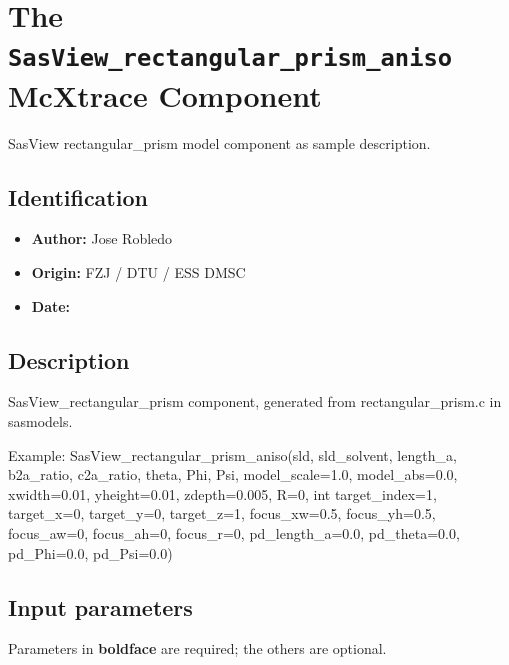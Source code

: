 \section{The \texttt{SasView\_rectangular\_prism\_aniso} McXtrace Component}
SasView rectangular\_prism model component as sample description.

\subsection*{Identification}
\begin{itemize}
  \item \textbf{Author:} Jose Robledo
  \item \textbf{Origin:} FZJ / DTU / ESS DMSC
  \item \textbf{Date:} 
\end{itemize}

\subsection*{Description}
SasView\_rectangular\_prism component, generated from rectangular\_prism.c in sasmodels.

Example: SasView\_rectangular\_prism\_aniso(sld, sld\_solvent, length\_a, b2a\_ratio, c2a\_ratio, theta, Phi, Psi, model\_scale=1.0, model\_abs=0.0, xwidth=0.01, yheight=0.01, zdepth=0.005, R=0, int target\_index=1, target\_x=0, target\_y=0, target\_z=1, focus\_xw=0.5, focus\_yh=0.5, focus\_aw=0, focus\_ah=0, focus\_r=0, pd\_length\_a=0.0, pd\_theta=0.0, pd\_Phi=0.0, pd\_Psi=0.0)

\subsection*{Input parameters}
Parameters in \textbf{boldface} are required; the others are optional.

